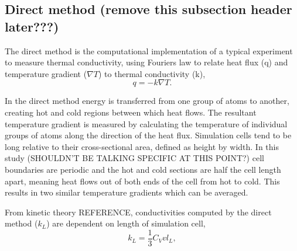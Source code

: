 \documentclass[%
preprint,                                  %
nofootinbib,
 amsmath,amssymb,
 aps,
]{revtex4-1}
\begin{document}
\subsection{\label{sec:intro.direct}Direct method (remove this subsection header later???)}

The direct method is the computational implementation of a typical experiment to measure thermal conductivity, using Fourier\textsc{}s law to relate heat flux (q) and temperature gradient ($\nabla{T}$) to thermal conductivity (k), 
\begin{equation}
q=-k \nabla{T} \label{fourier}.
\end{equation}

In the direct method energy is transferred from one group of atoms to another, creating hot and cold regions between which heat flows. The resultant temperature gradient is measured by calculating the temperature of individual groups of atoms along the direction of the heat flux. Simulation cells tend to be long relative to their cross-sectional area, defined as height by width. %
In this study (SHOULDN'T BE TALKING SPECIFIC AT THIS POINT?) cell boundaries are periodic and the hot and cold sections are half the cell length apart, meaning heat flows out of both ends of the cell from hot to cold. This results in two similar temperature gradients which can be averaged.




From kinetic theory REFERENCE, conductivities computed by the direct method ($k_L$) are dependent on length of simulation cell,
\begin{equation}
k_{L} = \frac{1}{3} C_{V} v l_{L} \label{length-dep},
\end{equation}
\end{document}
